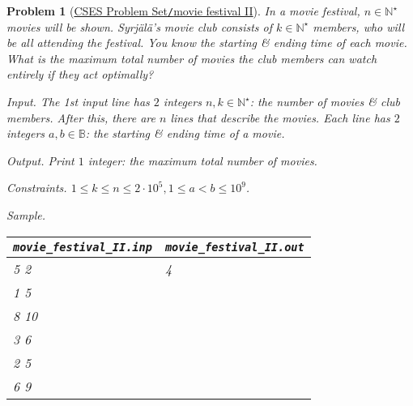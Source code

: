 \documentclass{article}
\newtheorem{problem}{Problem}
\begin{document}
\begin{problem}[\href{https://cses.fi/problemset/task/1632}{CSES Problem Set{\tt/}movie festival II}]
    In a movie festival, $n\in\mathbb{N}^\star$ movies will be shown. Syrjälä's movie club consists of $k\in\mathbb{N}^\star$ members, who will be all attending the festival. You know the starting \& ending time of each movie. What is the maximum total number of movies the club members can watch entirely if they act optimally?
    \item {\sf Input.} The 1st input line has $2$ integers $n,k\in\mathbb{N}^\star$: the number of movies \& club members. After this, there are $n$ lines that describe the movies. Each line has $2$ integers $a,b\in\mathbb{B}$: the starting \& ending time of a movie.
    \item {\sf Output.} Print $1$ integer: the maximum total number of movies.
    \item {\sf Constraints.} $1\le k\le n\le2\cdot10^5,1\le a < b\le10^9$.
    \item {\sf Sample.}
    \begin{table}[H]
        \centering
        \begin{tabular}{|l|l|}
            \hline
            \verb|movie_festival_II.inp| & \verb|movie_festival_II.out| \\
            \hline
            5 2 & 4 \\
            1 5 & \\
            8 10 & \\
            3 6 & \\
            2 5 & \\
            6 9 & \\
            \hline
        \end{tabular}
    \end{table}
\end{problem}
\end{document}
